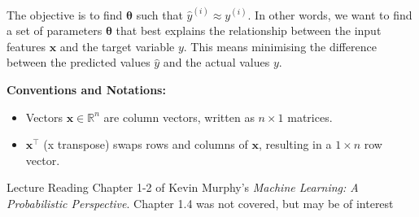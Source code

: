 The objective is to find \(\bm{\theta}\) such that \(\hat{y}^{(i)} \approx y^{(i)}\). In other words, we want to find a set of parameters \(\bm{\theta}\) that best explains the relationship between the input features \(\bm{x}\) and the target variable \(y\). This means minimising the difference between the predicted values \(\hat{y}\) and the actual values \(y\).\bigskip

\textbf{Conventions and Notations:}
\begin{itemize}[noitemsep]
    \item Vectors \(\bm{x} \in \mathbb{R}^n\) are column vectors, written as \(n \times 1\) matrices.
    \item \(\bm{x}^\top\) (x transpose) swaps rows and columns of \(\bm{x}\), resulting in a \(1 \times n\) row vector.
\end{itemize}




\begin{referencebox}{Lecture Reading}
    Chapter 1-2 of Kevin Murphy's \textit{Machine Learning: A Probabilistic Perspective}. Chapter 1.4 was not covered, but may be of interest
\end{referencebox}




